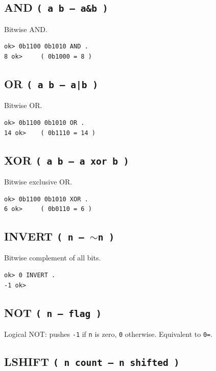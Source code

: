 \subsection*{AND \texttt{( a b -- a\&b )}}

Bitwise AND.

\begin{lstlisting}[language=Forth]
ok> 0b1100 0b1010 AND .
8 ok>     ( 0b1000 = 8 )
\end{lstlisting}

\subsection*{OR \texttt{( a b -- a|b )}}

Bitwise OR.

\begin{lstlisting}[language=Forth]
ok> 0b1100 0b1010 OR .
14 ok>    ( 0b1110 = 14 )
\end{lstlisting}

\subsection*{XOR \texttt{( a b -- a xor b )}}

Bitwise exclusive OR.

\begin{lstlisting}[language=Forth]
ok> 0b1100 0b1010 XOR .
6 ok>     ( 0b0110 = 6 )
\end{lstlisting}

\subsection*{INVERT \texttt{( n -- $\sim$n )}}

Bitwise complement of all bits.

\begin{lstlisting}[language=Forth]
ok> 0 INVERT .
-1 ok>
\end{lstlisting}

\subsection*{NOT \texttt{( n -- flag )}}

Logical NOT: pushes \texttt{-1} if \texttt{n} is zero, \texttt{0} otherwise.
Equivalent to \texttt{0=}.

\subsection*{LSHIFT \texttt{( n count -- n shifted )}}

